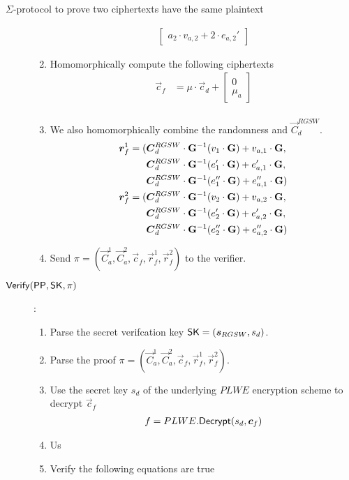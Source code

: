\begin{section}{$\Sigma$-protocol to prove two ciphertexts have the same plaintext}
\begin{description}
\begin{enumerate}
\begin{align*}
\begin{bmatrix}
            a_2 \cdot v_{a,2} + 2 \cdot e_{a,2}' \end{bmatrix}
        \end{align*}
        \item Homomorphically compute the following ciphertexts
        \begin{align*}
          \vec{c}_f &= \mu \cdot \vec{c}_d + \begin{bmatrix} 0 \\ \mu_a \end{bmatrix}\\
        \end{align*}
        \item We also homomorphically combine the randomness and $\vec{C}^{RGSW}_d$.
        \begin{align*}
          \vec{r}^1_f = (&\vec{C}^{RGSW}_d \cdot \mat{G}^{-1}(v_1 \cdot \mat{G}) + v_{a,1} \cdot \mat{G}, \\
          & \vec{C}^{RGSW}_d \cdot \mat{G}^{-1}(e_1' \cdot \mat{G}) + e_{a,1}' \cdot \mat{G},\\
          & \vec{C}^{RGSW}_d \cdot \mat{G}^{-1}(e_1'' \cdot \mat{G}) + e_{a,1}'' \cdot \mat{G})\\
          \vec{r}^2_f = (&\vec{C}^{RGSW}_d \cdot \mat{G}^{-1}(v_2 \cdot \mat{G}) + v_{a,2} \cdot \mat{G}, \\
          & \vec{C}^{RGSW}_d \cdot \mat{G}^{-1}(e_2' \cdot \mat{G}) + e_{a,2}' \cdot \mat{G},\\
          & \vec{C}^{RGSW}_d \cdot \mat{G}^{-1}(e_2'' \cdot \mat{G}) + e_{a,2}'' \cdot \mat{G})\\
        \end{align*}
        \item Send $\pi = (\vec{C}^1_a, \vec{C}^2_a, \vec{c}_f, \vec{r}^1_f, \vec{r}^2_f)$ to the verifier.
      \end{enumerate}




      \item [${\mathsf{Verify}}({\mathsf{PP}}, \mathsf{SK}, \pi)$]:
      \begin{enumerate}
        \item Parse the secret verifcation key $\SK = (\vec{s}_{RGSW}, s_d)$.
        \item Parse the proof $\pi = (\vec{C}^1_a, \vec{C}^2_a, \vec{c}_f, \vec{r}^1_f, \vec{r}^2_f)$.
        \item Use the secret key $s_d$ of the underlying $PLWE$ encryption scheme to decrypt $\vec{c}_f$
        \begin{align*}
          f &= PLWE.\Dec(s_d, \vec{c}_f)\\
        \end{align*}
        \item Us
        \item Verify the following equations are true
        \begin{align*}


\end{align*}
\end{enumerate}
\end{description}
\end{section}
